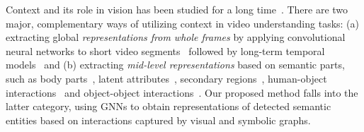 \documentclass[runningheads]{llncs}
\begin{document}
 Context and its role in vision has been studied for a long
time~\cite{Oliva:TCS07}.
There are two major, complementary ways of utilizing context in video understanding tasks: (a) extracting global \emph{representations from whole frames} by applying convolutional neural networks to short video segments~\cite{Simonyan:NIPS14,Tran:ICCV15,Wang:ECCV16,Carreira:CVPR17,Zhou:CVPR19} followed by long-term temporal models~\cite{Lea:CVPR17,Piergiovanni:CVPR18,Zhou:CVPR19}  
and (b) extracting \emph{mid-level representations} based on semantic parts, such as body parts~\cite{Cheron:ICCV15,Mavroudi:WACV17}, latent attributes~\cite{Liu:CVPR11}, secondary regions~\cite{Gkioxari:ICCV15}, human-object interactions~\cite{Prest:TPAMI12,Zhou:CVPR15} and object-object interactions~\cite{Ma:CVPR18,Baradel:ECCV18,Zhou:CVPR19}. Our proposed method falls into the latter category, using GNNs to obtain representations of detected semantic entities based on interactions captured by visual and symbolic graphs.
\end{document}
